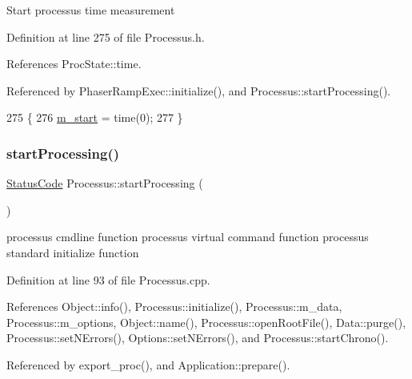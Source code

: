 Start processus time measurement 

Definition at line 275 of file Processus.\+h.



References Proc\+State\+::time.



Referenced by Phaser\+Ramp\+Exec\+::initialize(), and Processus\+::start\+Processing().


\begin{DoxyCode}
275                     \{
276     \hyperlink{classProcessus_a8ec00b2e12c5beada932610f30218e93}{m\_start} = time(0);
277   \}
\end{DoxyCode}
\mbox{\label{classProcessus_a09319bde9bed93e290f69b4e04585543}} 
\subsubsection{\texorpdfstring{start\+Processing()}{startProcessing()}}
{\footnotesize\ttfamily \hyperlink{classStatusCode}{Status\+Code} Processus\+::start\+Processing (\begin{DoxyParamCaption}{ }\end{DoxyParamCaption})\hspace{0.3cm}{\ttfamily [inherited]}}

processus cmdline function processus virtual command function processus standard initialize function 

Definition at line 93 of file Processus.\+cpp.



References Object\+::info(), Processus\+::initialize(), Processus\+::m\+\_\+data, Processus\+::m\+\_\+options, Object\+::name(), Processus\+::open\+Root\+File(), Data\+::purge(), Processus\+::set\+N\+Errors(), Options\+::set\+N\+Errors(), and Processus\+::start\+Chrono().



Referenced by export\+\_\+proc(), and Application\+::prepare().


